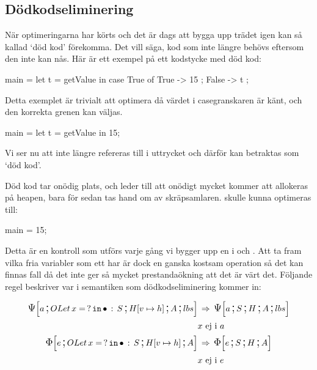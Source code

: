 \documentclass[../Optimise]{subfiles}
\begin{document}
\subsection{Dödkodseliminering}
\label{sec:DeadCode}

När optimeringarna har körts och det är dags att bygga upp trädet igen kan
så kallad `död kod' förekomma. Det vill säga, kod som inte längre 
behövs eftersom den inte kan nås. Här är ett exempel på ett kodstycke med
död kod:

\begin{codeEx}
main = let t = getValue 
       in case True of
              { True  -> 15
              ; False -> t
              };
\end{codeEx}

Detta exemplet är trivialt att optimera då värdet i casegranskaren är känt, och 
den korrekta grenen kan väljas.

\begin{codeEx}
main = let t = getValue in 15;
\end{codeEx}


Vi ser nu att  inte längre refereras till i uttrycket  
och därför kan  betraktas som `död kod'. 

Död kod tar onödig plats, och leder till att onödigt mycket kommer att 
allokeras på heapen, bara för sedan tas hand om av skräpsamlaren.  skulle
kunna optimeras till:

\begin{codeEx}
main = 15;
\end{codeEx}

\begin{comment}
Denna process kan mer formellt skrivas som:

\begin{mathpar}
\inferrule
  {t\,\text{ej fri variabel i}\,e_2}
  {\mathtt{let}\,t\,=\,e_1\,\mathtt{in}\,e_2 \Rightarrow e_2}
\;
\end{mathpar}
\end{comment}

Detta är en kontroll som utförs varje gång vi bygger upp en  
i \iIrr och \iPsi. Att ta fram vilka fria variabler som ett har är dock en 
ganska kostsam operation så det kan finnas fall då det inte ger så mycket
prestandaökning att det är värt det. Följande regel beskriver
var i semantiken som dödkodseliminering kommer in:

\begin{align*}
\CBNPSI{\cOLet xS}{\heap vh}A{lbs}a & \rulesep \CBNPSI SHA{lbs}a\\
& x \text{ ej i } a \nonumber \\
\CBNIRR{\cOLet xS}{\heap vh}Ae & \rulesep \CBNIRR SHAe\\
& x \text{ ej i } e \nonumber
\end{align*}
\end{document}
